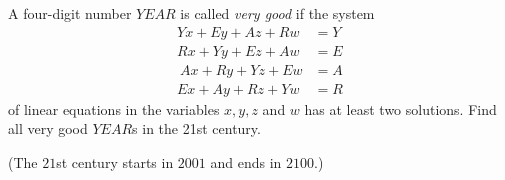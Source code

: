 A four-digit number \(YEAR\) is called \textit{very good} if the system
\begin{align*}
Yx+Ey+Az+Rw& =Y\\
Rx+Yy+Ez+Aw & = E\\\
Ax+Ry+Yz+Ew & = A\\
Ex+Ay+Rz+Yw &= R
\end{align*}of linear equations in the variables \(x,y,z\) and \(w\) has at least two solutions. Find all very good \(YEAR\)s in the 21st century.

(The \(21\)st century starts in \(2001\) and ends in \(2100\).)

